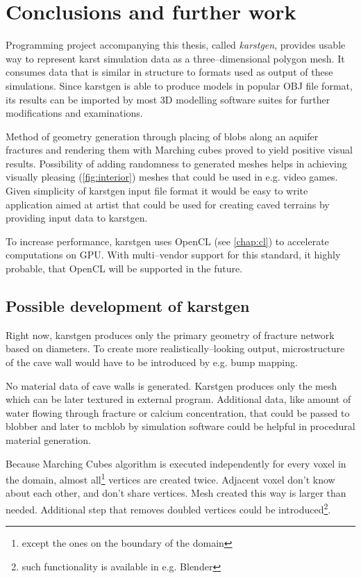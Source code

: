 \chapter{Conclusions and further work}
\label{chap:furtherwork}

Programming project accompanying this thesis, called \emph{karstgen}, provides
usable way to represent karst simulation data as a three--dimensional polygon
mesh. It consumes data that is similar in structure to formats used as output of
these simulations. Since karstgen is able to produce models in popular OBJ file
format, its results can be imported by most 3D modelling software suites for further
modifications and examinations.

Method of geometry generation through placing of blobs along an aquifer fractures
and rendering them with Marching cubes proved to yield positive visual results.
Possibility of adding randomness to generated meshes helps in achieving
visually pleasing (\autoref{fig:interior}) meshes that could be used in e.g.
video games. Given simplicity of karstgen input file format it would be easy to
write application aimed at artist that could be used for creating caved terrains
by providing input data to karstgen.

To increase performance, karstgen uses OpenCL (see \autoref{chap:cl}) to
accelerate computations on GPU. With multi--vendor support for this standard,
it highly probable, that OpenCL will be supported in the future.

\section{Possible development of karstgen}

Right now, karstgen produces only the primary geometry of fracture network based
on diameters. To create more realistically--looking output, microstructure of
the cave wall would have to be introduced by e.g. bump mapping.

No material data of cave walls is generated. Karstgen produces only the mesh which
can be later textured in external program. Additional data, like amount of water
flowing through fracture or calcium concentration, that could be passed to blobber
and later to mcblob by simulation software could be helpful in procedural
material generation.

Because Marching Cubes algorithm is executed independently for every voxel in the
domain, almost all\footnote{except the ones on the boundary of the domain}
vertices are created twice. Adjacent voxel don't know about
each other, and don't share vertices. Mesh created this way is larger than
needed. Additional step that removes doubled vertices could be
introduced\footnote{such functionality is available in e.g. Blender}.


